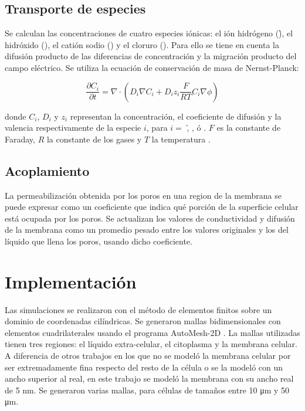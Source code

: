 \documentclass[11pt, twocolumn]{article}
\begin{document}

\subsection{Transporte de especies}
Se calculan las concentraciones de cuatro especies iónicas: el ión hidrógeno (\h), el hidróxido (\oh), el catión sodio (\na) y el cloruro (\cl). Para ello se tiene en cuenta la difusión producto de las diferencias de concentración y la migración producto del campo eléctrico. Se utiliza la ecuación de conservación de masa de Nernst-Planck:

\begin{equation} \label{eq:trans}
	\frac{\partial C_i}{\partial t} = \nabla \cdot \left( D_i \nabla C_i + D_i z_i \frac{F}{R T} C_i \nabla \phi \right)
\end{equation}

donde $C_i$, $D_i$ y $z_i$ representan la concentración, el coeficiente de difusión y la valencia 
respectivamente de la especie $i$, para $i = $ \h, \oh, \na ó \cl.
$F$ es la constante de Faraday, $R$ la constante de los gases y $T$ la temperatura \cite{fodava}.\\

\subsection{Acoplamiento}
La permeabilización obtenida por los poros en una region de la membrana se puede expresar como un coeficiente que indica qué porción de la superficie celular está ocupada por los poros. Se actualizan los valores de conductividad y difusión de la membrana como un promedio pesado entre los valores originales y los del líquido que llena los poros, usando dicho coeficiente.

\section{Implementación}
Las simulaciones se realizaron con el método de elementos finitos sobre un dominio de coordenadas cilíndricas. Se generaron mallas bidimensionales con elementos cuadrilaterales usando el programa AutoMesh-2D \cite{automesh}. La mallas utilizadas tienen tres regiones: el líquido extra-celular, el citoplasma y la membrana celular. A diferencia de otros trabajos en los que no se modeló la membrana celular por ser extremadamente fina respecto del resto de la célula o se la modeló con un ancho superior al real, en este trabajo se modeló la membrana con su ancho real de 5 \si{\nano\metre}. Se generaron varias mallas, para células de tamaños entre 10 \si{\micro\metre} y 50 \si{\micro\metre}.\\
\end{document}
